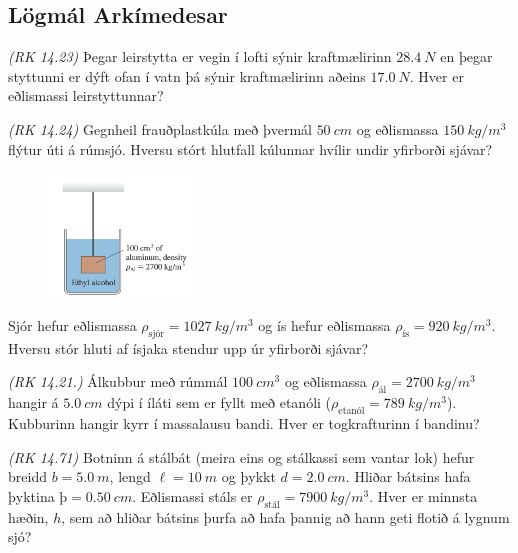 \begin{enumerate}[label = \textbf{Dæmi \thechapter.\arabic*.}]
\begin{minipage}{\linewidth}
\subsection*{Lögmál Arkímedesar}

\item \textit{(RK 14.23)} Þegar leirstytta er vegin í lofti sýnir kraftmælirinn $\SI{28.4}{N}$ en þegar styttunni er dýft ofan í vatn þá sýnir kraftmælirinn aðeins $\SI{17.0}{N}$. Hver er eðlismassi leirstyttunnar?

\item \textit{(RK 14.24)} Gegnheil frauðplastkúla með þvermál $\SI{50}{cm}$ og eðlismassa $\SI{150}{kg/m^3}$ flýtur úti á rúmsjó. Hversu stórt hlutfall kúlunnar hvílir undir yfirborði sjávar?

\end{minipage}

\begin{minipage}{\linewidth}

\begin{figure}
\vspace{-0.5cm}
\includegraphics[width=1.5in]{images/alkubb.png}
\end{figure}

\item Sjór hefur eðlismassa $\rho_{\text{sjór}} = \SI{1027}{kg/m^3}$ og ís hefur eðlismassa $\rho_{\text{ís}} = \SI{920}{kg/m^3}$. Hversu stór hluti af ísjaka stendur upp úr yfirborði sjávar?

\item \textit{(RK 14.21.)} Álkubbur með rúmmál $\SI{100}{cm^3}$ og eðlismassa $\rho_{\text{ál}} = \SI{2700}{kg/m^3}$ hangir á $\SI{5.0}{cm}$ dýpi í íláti sem er fyllt með etanóli ($\rho_{\text{etanól}} = \SI{789}{kg/m^3}$). Kubburinn hangir kyrr í massalausu bandi. Hver er togkrafturinn í bandinu?

\item \textit{(RK 14.71)} Botninn á stálbát (meira eins og stálkassi sem vantar lok) hefur breidd $b = \SI{5.0}{m}$, lengd $\ell = \SI{10}{m}$ og þykkt $d = \SI{2.0}{cm}$. Hliðar bátsins hafa þyktina $þ = \SI{0.50}{cm}$. Eðlismassi stáls er $\rho_{\text{stál}} = \SI{7900}{kg/m^3}$. Hver er minnsta hæðin, $h$, sem að hliðar bátsins þurfa að hafa þannig að hann geti flotið á lygnum sjó?


\end{minipage}
\end{enumerate}
